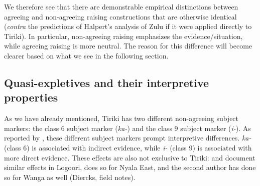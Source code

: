 \documentclass[output=paper,colorlinks,citecolor=brown
]{langscibook}
\begin{document}
We therefore see that there are demonstrable empirical distinctions between agreeing and non-agreeing raising constructions that are otherwise identical (\textit{contra} the predictions of Halpert's \citeyear{Halpert2019RaisingUnphased} analysis of Zulu if it were applied directly to Tiriki). In particular, non-agreeing raising emphasizes the evidence/situation, while agreeing raising is more neutral. The reason for this difference will become clearer based on what we see in the following section.

\subsection{Quasi-expletives and their interpretive properties} \label{sec:johnson:InterpretExpletives}

As we have already mentioned, Tiriki has two different non-agreeing subject markers: the class 6 subject marker (\textit{ka-}) and the class 9 subject marker (\textit{i-}). As reported by \cite{diercksetal2022luyia}, these different subject markers prompt interpretive differences. \textit{ka-} (class 6) is associated with indirect evidence, while \textit{i-} (class 9) is associated with more direct evidence. These effects are also not exclusive to Tiriki:  \citet{GluckmanBowler:2017:LogooriExpletives} and \citet{Gluckman2021Expletives} document similar effects in Logoori, \citet{Gluckman2023Perspectival} does so for Nyala East, and the second author has done so for Wanga as well (Diercks, field notes).







\end{document}
